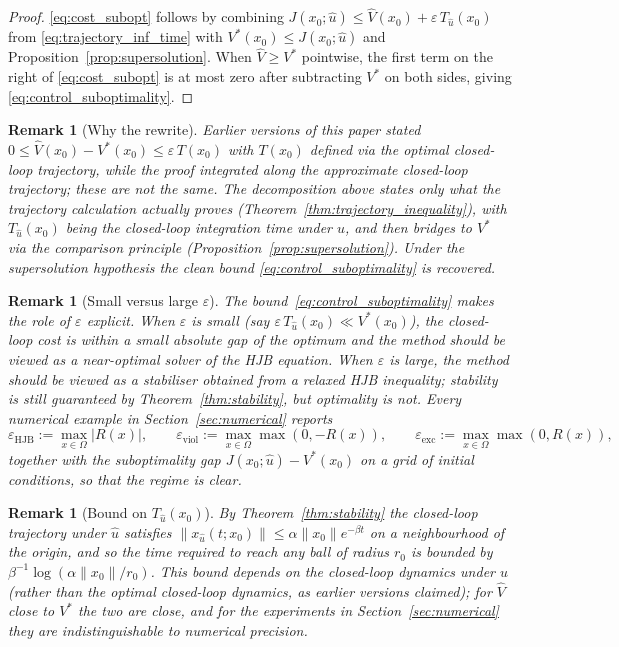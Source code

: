 \documentclass[11pt]{article}
\newtheorem{remark}[theorem]{Remark}
\begin{document}
\begin{proof}
\eqref{eq:cost_subopt} follows by combining $J(x_0;\hat u) \leq \hat V(x_0) + \varepsilon\, T_{\hat u}(x_0)$ from \eqref{eq:trajectory_inf_time} with $V^*(x_0) \leq J(x_0;\hat u)$ and Proposition~\ref{prop:supersolution}. When $\hat V \geq V^*$ pointwise, the first term on the right of \eqref{eq:cost_subopt} is at most zero after subtracting $V^*$ on both sides, giving \eqref{eq:control_suboptimality}.
\end{proof}

\begin{remark}[Why the rewrite]
\label{rem:rewrite_subopt}
Earlier versions of this paper stated $0 \le \hat V(x_0) - V^*(x_0) \le \varepsilon\, T(x_0)$ with $T(x_0)$ defined via the \emph{optimal} closed-loop trajectory, while the proof integrated along the \emph{approximate} closed-loop trajectory; these are not the same. The decomposition above states only what the trajectory calculation actually proves (Theorem~\ref{thm:trajectory_inequality}), with $T_{\hat u}(x_0)$ being the closed-loop integration time under $\hat u$, and then bridges to $V^*$ via the comparison principle (Proposition~\ref{prop:supersolution}). Under the supersolution hypothesis the clean bound \eqref{eq:control_suboptimality} is recovered.
\end{remark}

\begin{remark}[Small versus large $\varepsilon$]
\label{rem:eps_regimes}
The bound~\eqref{eq:control_suboptimality} makes the role of $\varepsilon$ explicit. When $\varepsilon$ is small (say $\varepsilon\,T_{\hat u}(x_0) \ll V^*(x_0)$), the closed-loop cost is within a small absolute gap of the optimum and the method should be viewed as a near-optimal solver of the HJB \emph{equation}. When $\varepsilon$ is large, the method should be viewed as a stabiliser obtained from a relaxed HJB \emph{inequality}; stability is still guaranteed by Theorem~\ref{thm:stability}, but optimality is not. Every numerical example in Section~\ref{sec:numerical} reports
\[
\varepsilon_{\mathrm{HJB}} := \max_{x\in\Omega}|R(x)|,\qquad
\varepsilon_{\mathrm{viol}} := \max_{x\in\Omega}\max(0,-R(x)),\qquad
\varepsilon_{\mathrm{exc}} := \max_{x\in\Omega}\max(0,R(x)),
\]
together with the suboptimality gap $J(x_0;\hat u) - V^*(x_0)$ on a grid of initial conditions, so that the regime is clear.
\end{remark}

\begin{remark}[Bound on $T_{\hat u}(x_0)$]
By Theorem~\ref{thm:stability} the closed-loop trajectory under $\hat u$ satisfies $\|x_{\hat u}(t;x_0)\| \leq \alpha\|x_0\|e^{-\beta t}$ on a neighbourhood of the origin, and so the time required to reach any ball of radius $r_0$ is bounded by $\beta^{-1}\log(\alpha\|x_0\|/r_0)$. This bound depends on the closed-loop dynamics under $\hat u$ (rather than the \emph{optimal} closed-loop dynamics, as earlier versions claimed); for $\hat V$ close to $V^*$ the two are close, and for the experiments in Section~\ref{sec:numerical} they are indistinguishable to numerical precision.
\end{remark}
\end{document}
